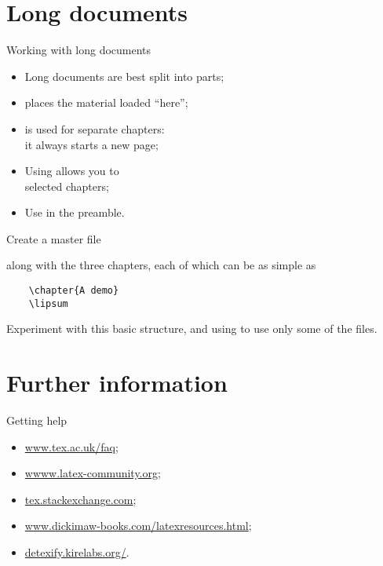 \section{Long documents}

\begin{frame}{Working with long documents}

  \begin{itemize}
    \item Long documents are best split into parts;
    \item {} places the material loaded \enquote{here};
    \item {} is used for separate chapters:\\ it always starts
      a new page;
    \item Using  allows you to \\
      selected chapters;
    \item Use  in the preamble.
  \end{itemize}
  
\end{frame}

\begin{exercise}

  Create a master file
  
  along with the three chapters, each of which can be as simple as
  \begin{verbatim}
    \chapter{A demo}
    \lipsum
  \end{verbatim}
  Experiment with this basic structure, and using  to
  use only some of the files.

\end{exercise}


\section{Further information}

\begin{frame}{Getting help}

  \begin{itemize}
    \item \url{www.tex.ac.uk/faq};
    \item \url{wwww.latex-community.org};
    \item \url{tex.stackexchange.com};
    \item \url{www.dickimaw-books.com/latexresources.html};
    \item \url{detexify.kirelabs.org/}.
  \end{itemize}

\end{frame}

